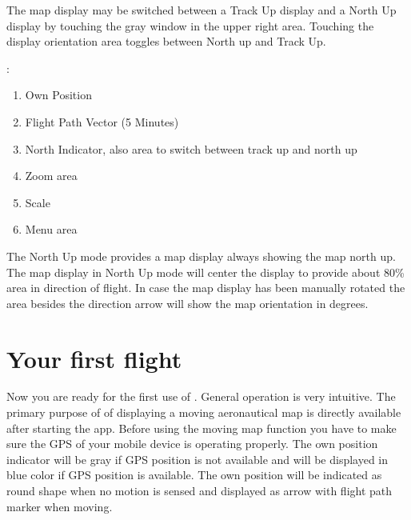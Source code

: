 \documentclass[letterpaper,10pt,english]{sphinxmanual}
\begin{document}
\sphinxAtStartPar
{}

\sphinxAtStartPar
The  map display may be switched between a Track Up
display and a North Up display by touching the gray window in the upper right
area.  Touching the display orientation area toggles between North up and Track
Up.

\begin{figure}[htbp]
\centering

\noindent{}
\end{figure}

\sphinxAtStartPar
{}:
\begin{enumerate}
%
\item {} 
\sphinxAtStartPar
Own Position

\item {} 
\sphinxAtStartPar
Flight Path Vector (5 Minutes)

\item {} 
\sphinxAtStartPar
North Indicator, also area to switch between track up and north up

\item {} 
\sphinxAtStartPar
Zoom area

\item {} 
\sphinxAtStartPar
Scale

\item {} 
\sphinxAtStartPar
Menu area

\end{enumerate}

\sphinxAtStartPar
The North Up mode provides a map display always showing the map north up.  The
 map display in North Up mode will center the
display to provide about 80\% area in direction of flight.  In case the map
display has been manually rotated the area besides the direction arrow will show
the map orientation in degrees.


\section{Your first flight}
\label{\detokenize{01-intro/getting_started:your-first-flight}}
\sphinxAtStartPar
Now you are ready for the first use of . General
operation is very intuitive. The primary purpose of  of displaying a moving aeronautical map is directly available after
starting the app.  Before using the moving map function you have to make sure
the GPS of your mobile device is operating properly. The own position indicator
will be gray if GPS position is not available and will be displayed in blue
color if GPS position is available. The own position will be indicated as round
shape when no motion is sensed and displayed as arrow with flight path marker
when moving.
\end{document}
